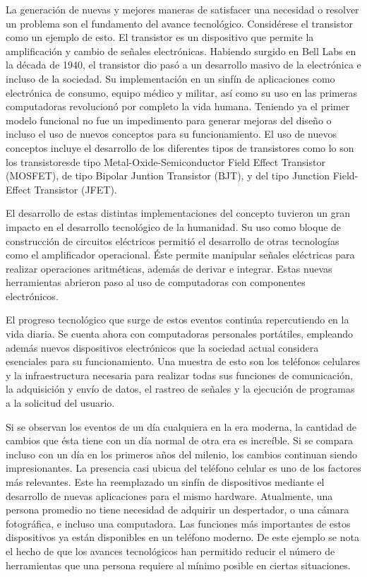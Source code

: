 \documentclass[a4paper,12pt]{article}
\begin{document}
La generación de nuevas y mejores maneras de satisfacer una necesidad o resolver un problema son el fundamento del avance tecnológico.
Considérese el transistor como un ejemplo de esto.
El transistor es un dispositivo que permite la amplificación y cambio de señales electrónicas.
Habiendo surgido en Bell Labs en la década de 1940, el transistor dio pasó a un desarrollo masivo de la electrónica e incluso de la sociedad.
Su implementación en un sinfín de aplicaciones como electrónica de consumo, equipo médico y militar, así como su uso en las primeras computadoras revolucionó por completo la vida humana.
Teniendo ya el primer modelo funcional no fue un impedimento para generar mejoras del diseño o incluso el uso de nuevos conceptos para su funcionamiento.
El uso de nuevos conceptos incluye el desarrollo de los diferentes tipos de transistores como lo son los transistoresde tipo Metal-Oxide-Semiconductor Field Effect Transistor (MOSFET), de tipo Bipolar Juntion Transistor (BJT), y del tipo Junction Field-Effect Transistor (JFET).

El desarrollo de estas distintas implementaciones del concepto tuvieron un gran impacto en el desarrollo tecnológico de la humanidad.
Su uso como bloque de construcción de circuitos eléctricos permitió el desarrollo de otras tecnologías como el amplificador operacional.
Éste permite manipular señales eléctricas para realizar operaciones aritméticas, además de derivar e integrar.
Estas nuevas herramientas abrieron paso al uso de computadoras con componentes electrónicos.

El progreso tecnológico que surge de estos eventos continúa repercutiendo en la vida diaria.
Se cuenta ahora con computadoras personales portátiles, empleando además nuevos dispositivos electrónicos que la sociedad actual considera esenciales para su funcionamiento.
Una muestra de esto son los teléfonos celulares y la infraestructura necesaria para realizar todas sus funciones de comunicación, la adquisición y envío de datos, el rastreo de señales y la ejecución de programas a la solicitud del usuario.

Si se observan los eventos de un día cualquiera en la era moderna, la cantidad de cambios que ésta tiene con un día normal de otra era es increíble.
Si se compara incluso con un día en los primeros años del milenio, los cambios continuan siendo impresionantes.
La presencia casi ubicua del teléfono celular es uno de los factores más relevantes.
Este ha reemplazado un sinfín de dispositivos mediante el desarrollo de nuevas aplicaciones para el mismo hardware.
Atualmente, una persona promedio no tiene necesidad de adquirir un despertador, o una cámara fotográfica, e incluso una computadora.
Las funciones más importantes de estos dispositivos ya están disponibles en un teléfono moderno.
De este ejemplo se nota el hecho de que los avances tecnológicos han permitido reducir el número de herramientas que una persona requiere al mínimo posible en ciertas situaciones.
\end{document}
